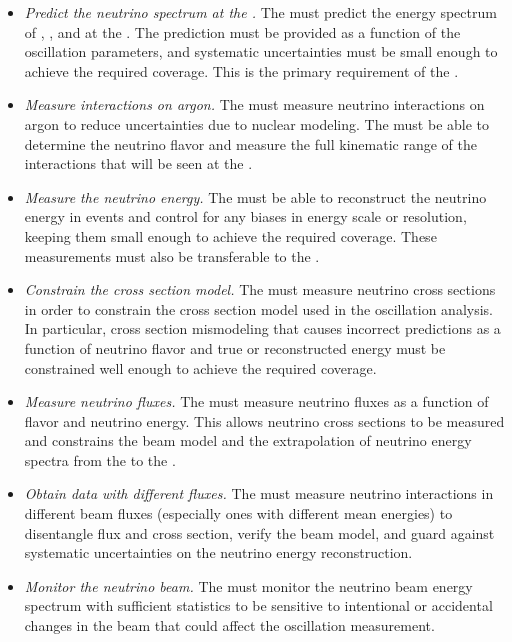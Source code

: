 \begin{itemize}
    \item  \textit{Predict the neutrino spectrum at the .} The  must predict the energy spectrum of \numu, \anumu, \nue and \anue at the . The prediction must be provided as a function of the oscillation parameters, and systematic uncertainties must be small enough to achieve the required  coverage. This is the primary requirement of the  .
    
    \item \textit{Measure interactions on argon.} The  must measure neutrino interactions on argon to reduce uncertainties due to nuclear modeling. The  must be able to determine the neutrino flavor and measure the full kinematic range of the interactions that will be seen at the .
    
    \item \textit{Measure the neutrino energy.} The  must be able to reconstruct the neutrino energy in  events and control for any biases in energy scale or resolution, keeping them small enough to achieve the required  coverage. These measurements must also be transferable to the . 
    
    \item \textit{Constrain the cross section model.} The  must measure neutrino cross sections in order to constrain the cross section model used in the oscillation analysis. In particular, cross section mismodeling that causes incorrect  predictions as a function of neutrino flavor and true or reconstructed energy must be constrained well enough to achieve the required  coverage. 
    
    \item \textit{Measure neutrino fluxes.} The  must measure neutrino fluxes as a function of flavor and neutrino energy. This allows neutrino cross sections to be measured and constrains the beam model and the extrapolation of neutrino energy spectra from the  to the .
    
    \item \textit{Obtain data with different fluxes.} The  must measure neutrino interactions in different beam fluxes (especially ones with different mean energies) to disentangle flux and cross section, verify the beam model, and guard against systematic uncertainties on the neutrino energy reconstruction.
    
    \item \textit{Monitor the neutrino beam.} The  must monitor the neutrino beam energy spectrum with sufficient statistics to be sensitive to intentional or accidental changes in the beam that could affect the oscillation measurement. 
    
\end{itemize}


